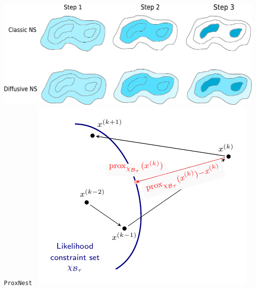 \documentclass[aspectratio=169,handout]{beamer}
\begin{document}
\begin{frame}
\begin{columns}[t]
        \includegraphics[width=\textwidth]{figures/dnest}
        \texttt{ProxNest}~
        \includegraphics[width=\textwidth]{figures/proxnest_diagram}
        \vfill
    \end{columns}
\end{frame}
\end{document}
